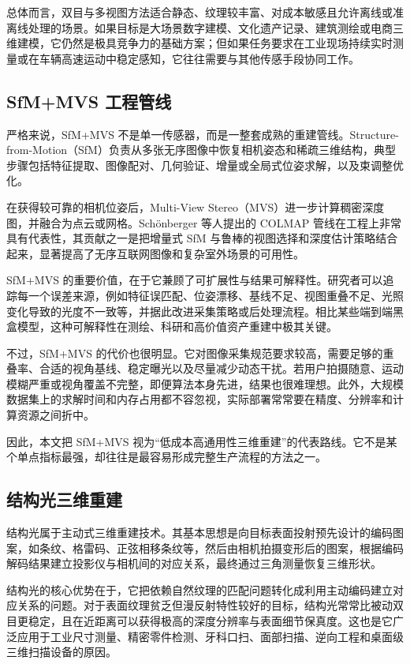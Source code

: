 \documentclass[12pt,a4paper]{ctexart}
\begin{document}
总体而言，双目与多视图方法适合静态、纹理较丰富、对成本敏感且允许离线或准离线处理的场景。如果目标是大场景数字建模、文化遗产记录、建筑测绘或电商三维建模，它仍然是极具竞争力的基础方案；但如果任务要求在工业现场持续实时测量或在车辆高速运动中稳定感知，它往往需要与其他传感手段协同工作。

\subsection{SfM+MVS 工程管线}

严格来说，SfM+MVS 不是单一传感器，而是一整套成熟的重建管线。Structure-from-Motion（SfM）负责从多张无序图像中恢复相机姿态和稀疏三维结构，典型步骤包括特征提取、图像配对、几何验证、增量或全局式位姿求解，以及束调整优化。\cite{schonberger2016sfm}

在获得较可靠的相机位姿后，Multi-View Stereo（MVS）进一步计算稠密深度图，并融合为点云或网格。Schönberger 等人提出的 COLMAP 管线在工程上非常具有代表性，其贡献之一是把增量式 SfM 与鲁棒的视图选择和深度估计策略结合起来，显著提高了无序互联网图像和复杂室外场景的可用性。\cite{schonberger2016sfm,schonberger2016mvs}

SfM+MVS 的重要价值，在于它兼顾了可扩展性与结果可解释性。研究者可以追踪每一个误差来源，例如特征误匹配、位姿漂移、基线不足、视图重叠不足、光照变化导致的光度不一致等，并据此改进采集策略或后处理流程。相比某些端到端黑盒模型，这种可解释性在测绘、科研和高价值资产重建中极其关键。\cite{seitz2006,schoeps2017eth3d}

不过，SfM+MVS 的代价也很明显。它对图像采集规范要求较高，需要足够的重叠率、合适的视角基线、稳定曝光以及尽量减少动态干扰。若用户拍摄随意、运动模糊严重或视角覆盖不完整，即便算法本身先进，结果也很难理想。此外，大规模数据集上的求解时间和内存占用都不容忽视，实际部署常常要在精度、分辨率和计算资源之间折中。\cite{schoeps2017eth3d,yao2018mvsnet}

因此，本文把 SfM+MVS 视为“低成本高通用性三维重建”的代表路线。它不是某个单点指标最强，却往往是最容易形成完整生产流程的方法之一。

\subsection{结构光三维重建}

结构光属于主动式三维重建技术。其基本思想是向目标表面投射预先设计的编码图案，如条纹、格雷码、正弦相移条纹等，然后由相机拍摄变形后的图案，根据编码解码结果建立投影仪与相机间的对应关系，最终通过三角测量恢复三维形状。\cite{scharstein2003,salvi2010}

结构光的核心优势在于，它把依赖自然纹理的匹配问题转化成利用主动编码建立对应关系的问题。对于表面纹理贫乏但漫反射特性较好的目标，结构光常常比被动双目更稳定，且在近距离可以获得极高的深度分辨率与表面细节保真度。这也是它广泛应用于工业尺寸测量、精密零件检测、牙科口扫、面部扫描、逆向工程和桌面级三维扫描设备的原因。\cite{salvi2010}
\end{document}
